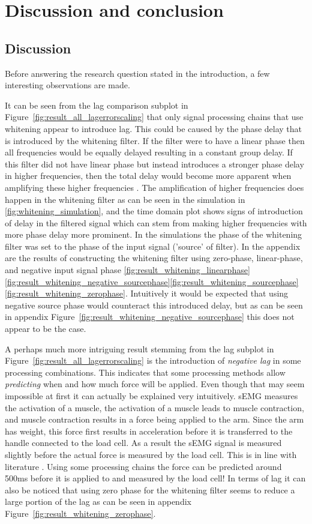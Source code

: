 \chapter{Discussion and conclusion}
\section{Discussion}
Before answering the research question stated in the introduction, a few interesting observations are made.

It can be seen from the lag comparison subplot in Figure~\ref{fig:result_all_lagerrorscaling} that only signal processing chains that use whitening appear to introduce lag. This could be caused by the phase delay that is introduced by the whitening filter. If the filter were to have a linear phase then all frequencies would be equally delayed resulting in a constant group delay. If this filter did not have linear phase but instead introduces a stronger phase delay in higher frequencies, then the total delay would become more apparent when amplifying these higher frequencies \cite{phase_delay_frequencies}. The amplification of higher frequencies does happen in the whitening filter as can be seen in the simulation in \ref{fig:whitening_simulation}, and the time domain plot shows signs of introduction of delay in the filtered signal which can stem from making higher frequencies with more phase delay more prominent. In the simulations the phase of the whitening filter was set to the phase of the input signal ('source' of filter). In the appendix are the results of constructing the whitening filter using zero-phase, linear-phase, and negative input signal phase \ref{fig:result_whitening_linearphase} \ref{fig:result_whitening_negative_sourcephase}\ref{fig:result_whitening_sourcephase}\ref{fig:result_whitening_zerophase}. Intuitively it would be expected that using negative source phase would counteract this introduced delay, but as can be seen in appendix Figure~\ref{fig:result_whitening_negative_sourcephase} this does not appear to be the case. 

A perhaps much more intriguing result stemming from the lag subplot in Figure~\ref{fig:result_all_lagerrorscaling} is the introduction of \textit{negative lag} in some processing combinations. This indicates that some processing methods allow \textit{predicting} when and how much force will be applied. Even though that may seem impossible at first it can actually be explained very intuitively. sEMG measures the activation of a muscle, the activation of a muscle leads to muscle contraction, and muscle contraction results in a force being applied to the arm. Since the arm has weight, this force first results in acceleration before it is transferred to the handle connected to the load cell. As a result the sEMG signal is measured slightly before the actual force is measured by the load cell. This is in line with literature \cite{human_robotics}. Using some processing chains the force can be predicted around 500ms before it is applied to and measured by the load cell! In terms of lag it can also be noticed that using zero phase for the whitening filter seems to reduce a large portion of the lag as can be seen in appendix Figure~\ref{fig:result_whitening_zerophase}.

